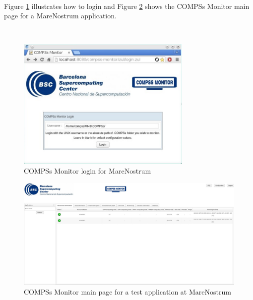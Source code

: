 
\newpage

~ \newline

Figure \ref{fig:mn_monitor1} illustrates how to login and Figure \ref{fig:mn_monitor2} shows the COMPSs Monitor
main page for a MareNostrum application. 

~ \newline

\begin{figure}[ht!]
  \centering
    \includegraphics[width=0.75\textwidth]{./Sections/4_Monitor/Figures/mn_monitor1.jpeg}
    \caption{COMPSs Monitor login for MareNostrum}
    \label{fig:mn_monitor1}
\end{figure}

\newpage

\begin{figure}[ht!]
  \centering
    \includegraphics[width=\textwidth]{./Sections/4_Monitor/Figures/mn_monitor2.jpeg}
    \caption{COMPSs Monitor main page for a test application at MareNostrum}
    \label{fig:mn_monitor2}
\end{figure}


